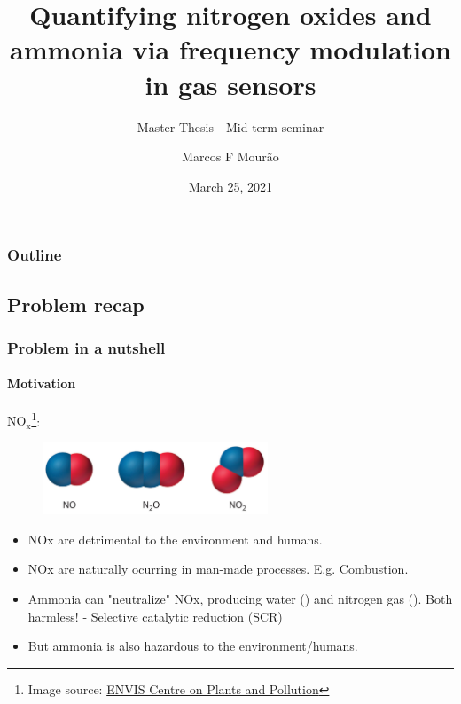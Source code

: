 \documentclass{beamer}
\title{Quantifying nitrogen oxides and ammonia via frequency modulation in gas sensors}
\subtitle{Master Thesis - Mid term seminar}
\author{Marcos F Mourão}
\date{March 25, 2021}
\begin{document}
	\begin{frame}
		\titlepage
	\end{frame}

\begin{frame}
	\frametitle{Outline}
	\tableofcontents
\end{frame}

\begin{frame}
	\section{Problem recap}
	\frametitle{Problem in a nutshell}
	\framesubtitle{Motivation}
	$\text{NO}_{\text{x}}$\footnote{Image source: \href{http://www.nbrienvis.nic.in/Database/1_2039.aspx}{ENVIS Centre on Plants and Pollution}}:
	\begin{figure}[!htb]
		\centering
		\includegraphics[width=0.6\textwidth]{../../figures/nox-molecules.jpg}
	\end{figure} 
	\begin{itemize}
		\item NOx are detrimental to the environment and humans.
		
		\item NOx are naturally ocurring in man-made processes. E.g. Combustion.
		
		\item Ammonia can "neutralize" NOx, producing water () and nitrogen gas (). Both harmless! - Selective catalytic reduction (SCR)
		
		\item But ammonia is also hazardous to the environment/humans.
	\end{itemize}
	
\end{frame}
\end{document}
